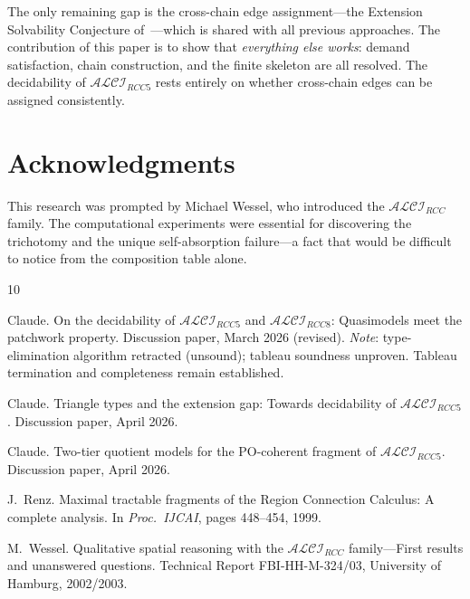 \documentclass[a4paper,11pt]{article}
\theoremstyle{definition}
\newcommand{\ALCIRCC}[1]{\ensuremath{\mathcal{ALCI}_{\mathit{RCC#1}}}}
\begin{document}
The only remaining gap is the cross-chain edge assignment---the
Extension Solvability Conjecture of~\cite{TrianglePaper}---which
is shared with all previous approaches.  The contribution of this
paper is to show that \emph{everything else works}: demand
satisfaction, chain construction, and the finite skeleton are all
resolved.  The decidability of $\ALCIRCC{5}$ rests entirely on
whether cross-chain edges can be assigned consistently.


\section*{Acknowledgments}

This research was prompted by Michael Wessel, who introduced the
$\ALCIRCC{}$ family.  The computational experiments were essential
for discovering the trichotomy and the unique self-absorption
failure---a fact that would be difficult to notice from the
composition table alone.



\begin{thebibliography}{10}

Claude.
\newblock On the decidability of {$\mathcal{ALCI}_{\mathit{RCC5}}$} and
  {$\mathcal{ALCI}_{\mathit{RCC8}}$}: Quasimodels meet the patchwork
  property.
\newblock Discussion paper, March 2026 (revised).
\newblock \emph{Note}: type-elimination algorithm retracted (unsound);
  tableau soundness unproven.  Tableau termination and completeness
  remain established.

Claude.
\newblock Triangle types and the extension gap: Towards decidability of
  {$\mathcal{ALCI}_{\mathit{RCC5}}$}.
\newblock Discussion paper, April 2026.

Claude.
\newblock Two-tier quotient models for the PO-coherent fragment of
  {$\mathcal{ALCI}_{\mathit{RCC5}}$}.
\newblock Discussion paper, April 2026.

J.~Renz.
\newblock Maximal tractable fragments of the {Region Connection Calculus}: A
  complete analysis.
\newblock In {\em Proc.\ IJCAI}, pages 448--454, 1999.

M.~Wessel.
\newblock Qualitative spatial reasoning with the
  {$\mathcal{ALCI}_\mathit{RCC}$} family---{F}irst results and unanswered
  questions.
\newblock Technical Report FBI-HH-M-324/03, University of Hamburg, 2002/2003.

\end{thebibliography}
\end{document}
